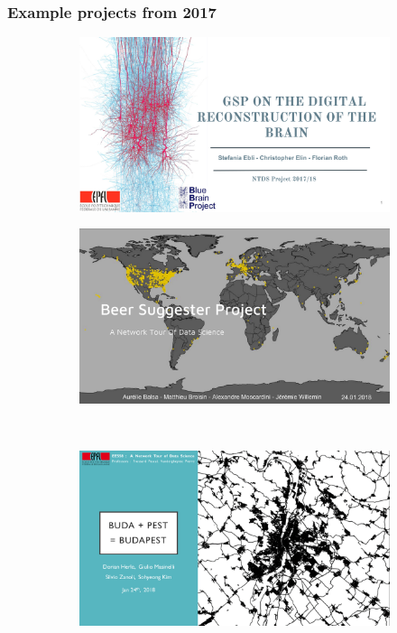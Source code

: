 \documentclass[aspectratio=169]{beamer}
\begin{document}
\begin{frame}
	\frametitle{Example projects from 2017}
	\begin{figure}
		\centering
		\begin{subfigure}[b]{0.47\linewidth}
			\includegraphics[width=\linewidth]{project2017_brain}
		\end{subfigure}
		\hfill
		\begin{subfigure}[b]{0.47\linewidth}
			\includegraphics[width=\linewidth]{project2017_beer}
		\end{subfigure}
		\\
		\vspace{0.5em}
		\begin{subfigure}[b]{0.47\linewidth}
			\includegraphics[width=\linewidth]{project2017_roads}

\end{subfigure}
\end{figure}
\end{frame}
\end{document}
